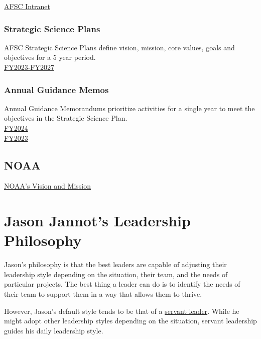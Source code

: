 \documentclass[
  letterpaper,
  DIV=11,
  numbers=noendperiod]{scrreprt}
\begin{document}
\href{https://sites.google.com/noaa.gov/myafsc}{AFSC Intranet}

\hypertarget{strategic-science-plans}{%
\subsection{Strategic Science Plans}\label{strategic-science-plans}}

AFSC Strategic Science Plans define vision, mission, core values, goals
and objectives for a 5 year period.\\
\href{https://drive.google.com/file/d/1m3KldIXozp1mSH-VwzSFw0F35kuVaojx/view}{FY2023-FY2027}

\hypertarget{annual-guidance-memos}{%
\subsection{Annual Guidance Memos}\label{annual-guidance-memos}}

Annual Guidance Memorandums prioritize activities for a single year to
meet the objectives in the Strategic Science Plan.\\
\href{https://drive.google.com/file/d/1aMWiMJYuM8pueNbeHaLJoRBG6VlzTFYP/view}{FY2024}\\
\href{https://drive.google.com/file/d/1EuLPPk031l8KWI1bVu-W0F3H9waHoRK4/view}{FY2023}

\hypertarget{noaa}{%
\section{NOAA}\label{noaa}}

\href{https://www.noaa.gov/our-mission-and-vision}{NOAA's Vision and
Mission}

\cleardoublepage
{}
{}
\appendix

\hypertarget{sec-jj-philosophy}{%
\chapter{Jason Jannot's Leadership Philosophy}\label{sec-jj-philosophy}}

Jason's philosophy is that the best leaders are capable of adjusting
their leadership style depending on the situation, their team, and the
needs of particular projects. The best thing a leader can do is to
identify the needs of their team to support them in a way that allows
them to thrive.

However, Jason's default style tends to be that of a
\href{https://en.wikipedia.org/wiki/Servant_leadership}{servant leader}.
While he might adopt other leadership styles depending on the situation,
servant leadership guides his daily leadership style.
\end{document}
